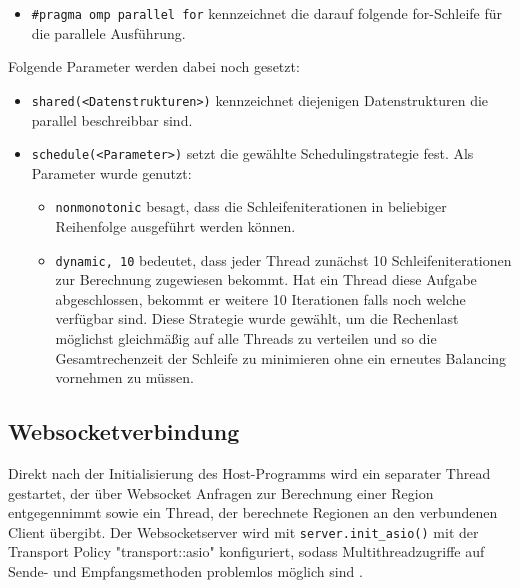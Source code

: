 \begin{itemize}
	\item \verb|#pragma omp parallel for| kennzeichnet die darauf folgende for-Schleife für die parallele Ausführung.
\end{itemize}

Folgende Parameter werden dabei noch gesetzt:

\begin{itemize}
	\item \verb|shared(<Datenstrukturen>)| kennzeichnet diejenigen Datenstrukturen die parallel beschreibbar sind.
	
	\item \verb|schedule(<Parameter>)| setzt die gewählte Schedulingstrategie fest. Als Parameter wurde genutzt:
	
	\begin{itemize}
		\item \verb|nonmonotonic| besagt, dass die Schleifeniterationen in beliebiger Reihenfolge ausgeführt werden können.
		
		\item \verb|dynamic, 10| bedeutet, dass jeder Thread zunächst 10 Schleifeniterationen zur Berechnung zugewiesen bekommt. Hat ein Thread diese Aufgabe abgeschlossen, bekommt er weitere 10 Iterationen falls noch welche verfügbar sind. Diese Strategie wurde gewählt, um die Rechenlast möglichst gleichmäßig auf alle Threads zu verteilen und so die Gesamtrechenzeit der Schleife zu minimieren ohne ein erneutes Balancing vornehmen zu müssen.
	\end{itemize}
\end{itemize}


\subsection{Websocketverbindung}\label{cls:Host}

Direkt nach der Initialisierung des Host-Programms wird ein separater Thread gestartet, der über Websocket
Anfragen zur Berechnung einer Region entgegennimmt sowie ein Thread, der berechnete Regionen an den verbundenen Client übergibt.
Der Websocketserver wird mit \verb|server.init_asio()| mit der Transport Policy "transport::asio"
konfiguriert, sodass Multithreadzugriffe auf Sende- und Empfangsmethoden problemlos möglich sind \cite{websocketppManual}.

